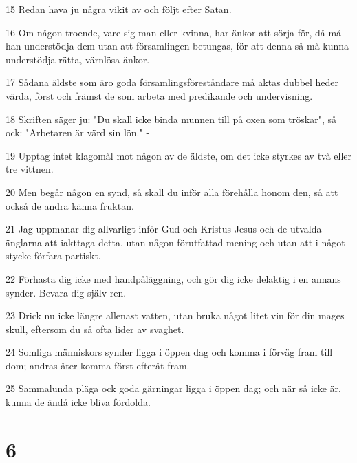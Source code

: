 \par 15 Redan hava ju några vikit av och följt efter Satan.
\par 16 Om någon troende, vare sig man eller kvinna, har änkor att sörja för, då må han understödja dem utan att församlingen betungas, för att denna så må kunna understödja rätta, värnlösa änkor.
\par 17 Sådana äldste som äro goda församlingsföreståndare må aktas dubbel heder värda, först och främst de som arbeta med predikande och undervisning.
\par 18 Skriften säger ju: "Du skall icke binda munnen till på oxen som tröskar", så ock: "Arbetaren är värd sin lön." -
\par 19 Upptag intet klagomål mot någon av de äldste, om det icke styrkes av två eller tre vittnen.
\par 20 Men begår någon en synd, så skall du inför alla förehålla honom den, så att också de andra känna fruktan.
\par 21 Jag uppmanar dig allvarligt inför Gud och Kristus Jesus och de utvalda änglarna att iakttaga detta, utan någon förutfattad mening och utan att i något stycke förfara partiskt.
\par 22 Förhasta dig icke med handpåläggning, och gör dig icke delaktig i en annans synder. Bevara dig själv ren.
\par 23 Drick nu icke längre allenast vatten, utan bruka något litet vin för din mages skull, eftersom du så ofta lider av svaghet.
\par 24 Somliga människors synder ligga i öppen dag och komma i förväg fram till dom; andras åter komma först efteråt fram.
\par 25 Sammalunda pläga ock goda gärningar ligga i öppen dag; och när så icke är, kunna de ändå icke bliva fördolda.

\chapter{6}


